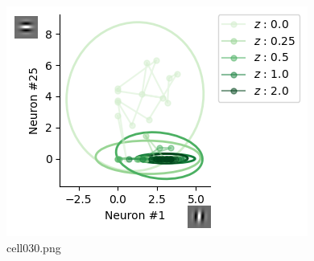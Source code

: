 \begin{figure}[ht]
	\centering
	\includegraphics[scale=0.8, max width=\linewidth]{./fig/bayesian-brain/neural-sampling/cell030.png}
	\caption{cell030.png}
	\label{cell030.png}
\end{figure}
